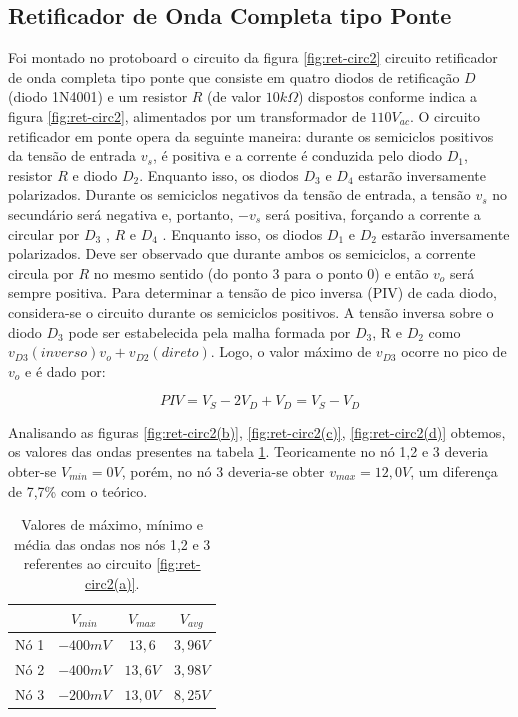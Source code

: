 \documentclass[a4paper]{article} %
\begin{document}
 \subsection{ Retificador de Onda Completa tipo Ponte}
         Foi montado no protoboard o circuito da figura \ref{fig:ret-circ2} circuito retificador de onda completa tipo ponte que consiste em quatro diodos de retificação $D$ (diodo 1N4001) e um resistor $R$    (de valor $10k\Omega$) dispostos conforme indica a figura \ref{fig:ret-circ2}, alimentados por um transformador de $110V_{ac}$.
         O circuito retificador em ponte opera da seguinte maneira: durante os semiciclos positivos da tensão de entrada $v_s$, é positiva e a corrente é conduzida pelo diodo $D_1$, resistor $R$ e diodo $D_2$. Enquanto isso, os diodos  $D_3$      e $D_4$   estarão inversamente polarizados. Durante os semiciclos negativos da tensão de entrada, a tensão $v_s$ no secundário será negativa e, portanto,  $-v_s$     será positiva, forçando a corrente a circular por $D_3$ , $R$ e $D_4$ . Enquanto isso, os diodos $D_1$ e $D_2$   estarão inversamente polarizados.
         Deve ser observado que durante ambos os semiciclos, a corrente circula por $R$ no mesmo sentido (do ponto 3 para o ponto 0) e então   $v_o$    será sempre positiva.
         Para determinar a tensão de pico inversa (PIV) de cada diodo, considera-se o circuito durante os semiciclos positivos. A tensão inversa sobre o diodo $D_3$ pode ser estabelecida pela malha formada por $D_3$, R e $D_2$         como  $v_{D3}(inverso)v_o+v_{D2}(direto)$. Logo, o valor máximo de $v_{D3}$     ocorre no pico de $v_o$    e é dado por:
                                    
\begin{equation}
PIV=V_S-2V_D+V_D=V_S-V_D
\end{equation}

Analisando as figuras \ref{fig:ret-circ2(b)}, \ref{fig:ret-circ2(c)}, \ref{fig:ret-circ2(d)} obtemos, os valores das ondas presentes na tabela \ref{tab:ret_tot_onda}. Teoricamente no nó 1,2 e 3 deveria obter-se $V_{min}=0V$, porém, no nó 3 deveria-se obter  $v_{max}=12,0V$, um diferença de 7,7\% com o teórico.


\begin{table}[h!]
\begin{centering}
\begin{tabular}{|c|c|c|c|}
\cline{2-4} 
\multicolumn{1}{c|}{} & $V_{min}$ & $V_{max}$ & $V_{avg}$\tabularnewline
\hline 
Nó 1 & $-400mV$ & $13,6$ & $3,96V$ \tabularnewline
\hline 
Nó 2 & $-400mV$ & $13,6V$ & $3,98V$\tabularnewline
\hline 
Nó 3 & $-200mV$ & $13,0V$ & $8,25V$\tabularnewline
\hline
\end{tabular}
\par\end{centering}

\caption{Valores de máximo, mínimo e média das ondas nos nós 1,2 e 3 referentes ao circuito  \ref{fig:ret-circ2(a)}.}

\label{tab:ret_tot_onda}
\end{table}
\end{document}
